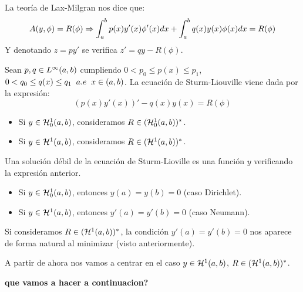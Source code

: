 La teoría de Lax-Milgran nos dice que:
\[
A(y,\phi)=R(\phi) \Rightarrow \displaystyle\int_{ a }^{ b } p(x)y'(x)\phi'(x)dx+\displaystyle\int_{ a }^{ b } q(x)y(x)\phi(x)dx=R(\phi)
\]
Y denotando $z=py'$ se verifica $z'=qy-R(\phi)$.

\begin{definition}
Sean $p,q\in L^{ \infty }(a,b)$ cumpliendo $0<p_0\leq p(x)\leq p_1$, $0<q_0\leq q(x)\leq q_1 \;\; a.e \;\; x\in(a,b)$. La ecuación de Sturm-Liouville viene dada por la expresión:
\[
(p(x)y'(x))'-q(x)y(x)=R(\phi)
\]
\begin{itemize}
\item Si $y\in\mathcal{H}_0^{ 1 } (a,b)$, consideramos $R\in(\mathcal{H}_0^{ 1 } (a,b))^*$.
\item Si $y\in\mathcal{H}^{ 1 } (a,b)$, consideramos $R\in(\mathcal{H}^{ 1 } (a,b))^*$.
\end{itemize}
\end{definition}
\begin{definition}
Una solución débil de la ecuación de Sturm-Lioville es una función $y$ verificando la expresión anterior.
\begin{itemize}
\item Si $y\in\mathcal{H}_0^{ 1 } (a,b)$, entonces $y(a)=y(b)=0$ (caso Dirichlet).
\item Si $y\in\mathcal{H}^{ 1 } (a,b)$, entonces $y'(a)=y'(b)=0$ (caso Neumann).
\end{itemize}
\end{definition}
\begin{remark}
Si consideramos $R\in(\mathcal{H}^{ 1 } (a,b))^*$, la condición $y'(a)=y'(b)=0$ nos aparece de forma natural al minimizar (visto anteriormente).
\end{remark} 

A partir de ahora nos vamos a centrar en el caso $y\in\mathcal{H}^{ 1 } (a,b)$, $R\in(\mathcal{H}^{ 1 } (a,b))^*$.

\textbf{que vamos a hacer a continuacion?}

